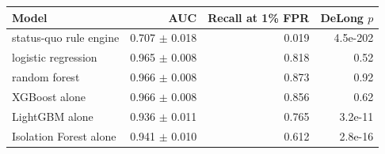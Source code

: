 \begin{tabular}{lrrr}
\toprule
Model & AUC & Recall at 1\% FPR & DeLong $p$ \\
\midrule
status-quo rule engine & 0.707 $\pm$ 0.018 & 0.019 & 4.5e-202 \\
logistic regression & 0.965 $\pm$ 0.008 & 0.818 & 0.52 \\
random forest & 0.966 $\pm$ 0.008 & 0.873 & 0.92 \\
XGBoost alone & 0.966 $\pm$ 0.008 & 0.856 & 0.62 \\
LightGBM alone & 0.936 $\pm$ 0.011 & 0.765 & 3.2e-11 \\
Isolation Forest alone & 0.941 $\pm$ 0.010 & 0.612 & 2.8e-16 \\
\bottomrule
\end{tabular}
